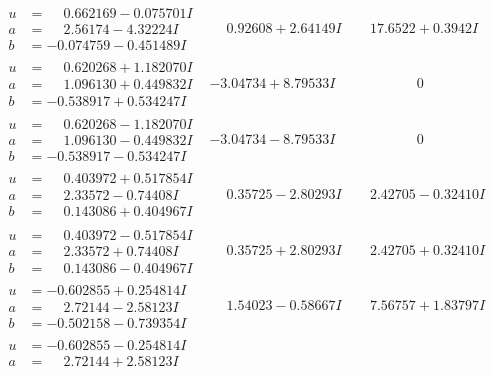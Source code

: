 \documentclass[1p]{elsarticle_modified}
\theoremstyle{definition}
\begin{document}
$$\begin{array}{c|c|c}
\begin{aligned}
u &= \phantom{-}0.662169 - 0.075701 I \\
a &= \phantom{-}2.56174 - 4.32224 I \\
b &= -0.074759 - 0.451489 I\end{aligned}
 & \phantom{-}0.92608 + 2.64149 I & \phantom{-}17.6522 + 0.3942 I \\ \hline\begin{aligned}
u &= \phantom{-}0.620268 + 1.182070 I \\
a &= \phantom{-}1.096130 + 0.449832 I \\
b &= -0.538917 + 0.534247 I\end{aligned}
 & -3.04734 + 8.79533 I & \phantom{-0.000000 } 0 \\ \hline\begin{aligned}
u &= \phantom{-}0.620268 - 1.182070 I \\
a &= \phantom{-}1.096130 - 0.449832 I \\
b &= -0.538917 - 0.534247 I\end{aligned}
 & -3.04734 - 8.79533 I & \phantom{-0.000000 } 0 \\ \hline\begin{aligned}
u &= \phantom{-}0.403972 + 0.517854 I \\
a &= \phantom{-}2.33572 - 0.74408 I \\
b &= \phantom{-}0.143086 + 0.404967 I\end{aligned}
 & \phantom{-}0.35725 - 2.80293 I & \phantom{-}2.42705 - 0.32410 I \\ \hline\begin{aligned}
u &= \phantom{-}0.403972 - 0.517854 I \\
a &= \phantom{-}2.33572 + 0.74408 I \\
b &= \phantom{-}0.143086 - 0.404967 I\end{aligned}
 & \phantom{-}0.35725 + 2.80293 I & \phantom{-}2.42705 + 0.32410 I \\ \hline\begin{aligned}
u &= -0.602855 + 0.254814 I \\
a &= \phantom{-}2.72144 - 2.58123 I \\
b &= -0.502158 - 0.739354 I\end{aligned}
 & \phantom{-}1.54023 - 0.58667 I & \phantom{-}7.56757 + 1.83797 I \\ \hline\begin{aligned}
u &= -0.602855 - 0.254814 I \\
a &= \phantom{-}2.72144 + 2.58123 I \\

\end{aligned}
\end{array}$$
\end{document}
